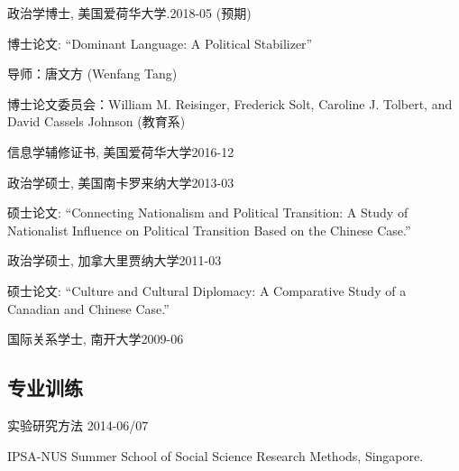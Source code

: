 \documentclass[10.5pt,]{article}
\providecommand{\tightlist}{%
  \setlength{\itemsep}{0pt}\setlength{\parskip}{0pt}}
\renewenvironment{itemize}{
  \begin{list}{}{
    \setlength{\leftmargin}{1.5em}
  }
}{
  \end{list}
}
\begin{document}
\begin{itemize}
\tightlist
\item
  政治学博士, 美国爱荷华大学.\hfill 2018-05 (预期)

  \begin{itemize}
  \tightlist
  \item
    \footnotesize 博士论文: ``Dominant Language: A Political
    Stabilizer''

    \begin{itemize}
    \tightlist
    \item
      导师：唐文方 (Wenfang Tang)
    \item
      博士论文委员会：William M. Reisinger, Frederick Solt, Caroline J.
      Tolbert, and David Cassels Johnson (教育系)
    \end{itemize}
  \end{itemize}
\item
  信息学辅修证书, 美国爱荷华大学\hfill 2016-12
\item
  政治学硕士, 美国南卡罗来纳大学\hfill 2013-03

  \begin{itemize}
  \tightlist
  \item
    \footnotesize 硕士论文: ``Connecting Nationalism and Political
    Transition: A Study of Nationalist Influence on Political Transition
    Based on the Chinese Case.''
  \end{itemize}
\item
  政治学硕士, 加拿大里贾纳大学\hfill 2011-03

  \begin{itemize}
  \tightlist
  \item
    \footnotesize 硕士论文: ``Culture and Cultural Diplomacy: A
    Comparative Study of a Canadian and Chinese Case.''
  \end{itemize}
\item
  国际关系学士, 南开大学\hfill 2009-06
\end{itemize}

\subsection{专业训练}

\begin{itemize}
\tightlist
\item
  实验研究方法 \hfill 2014-06/07

  \begin{itemize}
  \tightlist
  \item
    \footnotesize IPSA-NUS Summer School of Social Science Research
    Methods, Singapore.
  \end{itemize}
\end{itemize}
\end{document}

